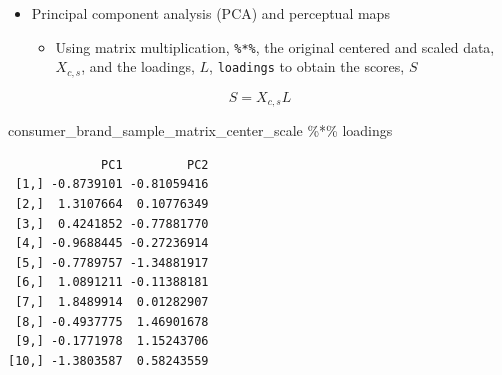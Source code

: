 \documentclass[
  ignorenonframetext,
]{beamer}
\newenvironment{Shaded}{\begin{snugshade}}{\end{snugshade}}
\newcommand{\NormalTok}[1]{\textcolor[rgb]{0.00,0.23,0.31}{#1}}
\newcommand{\SpecialCharTok}[1]{\textcolor[rgb]{0.37,0.37,0.37}{#1}}
\providecommand{\tightlist}{%
  \setlength{\itemsep}{0pt}\setlength{\parskip}{0pt}}\usepackage{longtable,booktabs,array}
\begin{document}
\begin{frame}[fragile]{}
\label{section-34}
\begin{itemize}
\item
  Principal component analysis (PCA) and perceptual maps

  \begin{itemize}
  \tightlist
  \item
    Using matrix multiplication, \texttt{\%*\%}, the original centered
    and scaled data, \(X_{c, s}\), and the loadings, \(L\),
    \texttt{loadings} to obtain the scores, \(S\)
  \end{itemize}
\end{itemize}

\[S = X_{c, s}L\]

\tiny

\begin{Shaded}
\begin{Highlighting}[]
\NormalTok{consumer\_brand\_sample\_matrix\_center\_scale }\SpecialCharTok{\%*\%}\NormalTok{ loadings}
\end{Highlighting}
\end{Shaded}

\begin{verbatim}
             PC1         PC2
 [1,] -0.8739101 -0.81059416
 [2,]  1.3107664  0.10776349
 [3,]  0.4241852 -0.77881770
 [4,] -0.9688445 -0.27236914
 [5,] -0.7789757 -1.34881917
 [6,]  1.0891211 -0.11388181
 [7,]  1.8489914  0.01282907
 [8,] -0.4937775  1.46901678
 [9,] -0.1771978  1.15243706
[10,] -1.3803587  0.58243559
\end{verbatim}
\end{frame}
\end{document}
